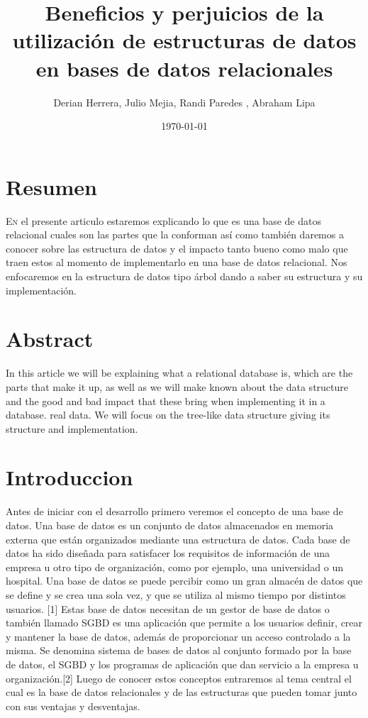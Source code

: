 \documentclass[twoside,twocolumn]{article}
\title{Beneficios y perjuicios de la utilización de estructuras de datos en bases de datos relacionales } %
\author{Derian Herrera, Julio Mejia, Randi Paredes , Abraham Lipa}
\date{\today} %
\begin{document}
\maketitle


\section{Resumen}

\lettrine[nindent=0em,lines=3]{E}n el presente articulo estaremos explicando lo que es una base de datos relacional cuales son las partes que la conforman así como también daremos a conocer sobre las estructura de datos y el impacto tanto bueno como malo que traen estos al momento de implementarlo en una base de datos relacional. Nos enfocaremos en la estructura de datos tipo árbol dando a saber su estructura y su implementación.




\section{Abstract}


In this article we will be explaining what a relational database is, which are the parts that make it up, as well as we will make known about the data structure and the good and bad impact that these bring when implementing it in a database. real data. 
We will focus on the tree-like data structure giving its structure and implementation.






\section{Introduccion}
Antes de iniciar con el desarrollo primero veremos el concepto de una base de datos.
Una base de datos es un conjunto de datos almacenados en memoria externa que están organizados mediante una estructura de datos. Cada base de datos ha sido diseñada para satisfacer los requisitos de información de una empresa u otro tipo de organización, como por ejemplo, una universidad o un hospital.
Una base de datos se puede percibir como un gran almacén de datos que se deﬁne y se crea una sola vez, y que se utiliza al mismo tiempo por distintos usuarios. [1]
Estas base de datos necesitan de un gestor de base de datos o también llamado SGBD es una aplicación que permite a los usuarios deﬁnir, crear y mantener la base de datos, además de proporcionar un acceso controlado a la misma. Se denomina sistema de bases de datos al conjunto formado por la base de datos, el SGBD y los programas de aplicación que dan servicio a la empresa u organización.[2]
Luego de conocer estos conceptos entraremos al tema central el cual es la base de datos relacionales y de las estructuras que pueden tomar junto con sus ventajas y desventajas.
\end{document}

